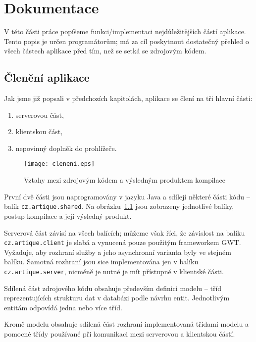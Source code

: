 \chapter{Dokumentace}

V této části práce popíšeme funkci/implementaci nejdůležitějších částí aplikace.
Tento popis je určen programátorům; má za cíl poskytnout dostatečný přehled o všech částech aplikace před tím, než se setká se zdrojovým kódem.

\section{Členění aplikace}

Jak jsme již popsali v předchozích kapitolách, aplikace se člení na tři hlavní části:
\begin{enumerate}
	\item serverovou část,
	\item klientskou část,
	\item nepovinný doplněk do prohlížeče.
\end{enumerate}

\begin{figure}
    \centering
    \texttt{[image: cleneni.eps]}
    \caption{Vztahy mezi zdrojovým kódem a výsledným produktem kompilace}
    \label{fig:cleneni}
\end{figure}

První dvě části jsou naprogramovány v jazyku Java a sdílejí některé části kódu -- balík \verb|cz.artique.shared|.
Na obrázku~\ref{fig:cleneni} jsou zobrazeny jednotlivé balíky, postup kompilace a její výsledný produkt.

Serverová část závisí na všech balících; můžeme však říci, že závislost na balíku \verb|cz.artique.client| je slabá a vynucená pouze použitým frameworkem GWT.
Vyžaduje, aby rozhraní služby a jeho asynchronní varianta byly ve stejném balíku.
Samotná rozhraní jsou sice implementována jen v balíku \verb|cz.artique.server|, nicméně je nutné je mít přístupné v klientské části.

Sdílená část zdrojového kódu obsahuje především definici modelu -- tříd reprezentujících strukturu dat v databázi podle návrhu entit.
Jednotlivým entitám odpovídá jedna nebo více tříd.

Kromě modelu obsahuje sdílená část rozhraní implementovaná třídami modelu a pomocné třídy používané při komunikaci mezi serverovou a klientskou částí.

